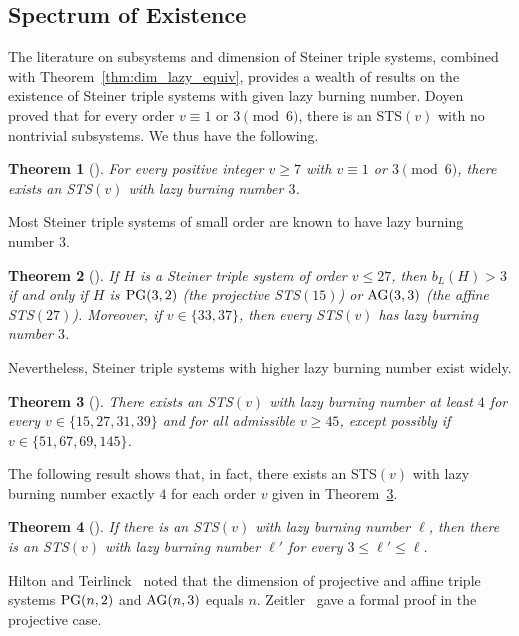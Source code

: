 \documentclass[12pt]{article}
\DeclareMathOperator{\PG}{\rm PG}
\DeclareMathOperator{\AG}{\rm AG}
\newtheorem{theorem}{Theorem}[section]
\theoremstyle{definition}
\numberwithin{table}{section}
\begin{document}
\subsection{Spectrum of Existence}
The literature on subsystems and dimension of Steiner triple systems, combined with Theorem~\ref{thm:dim_lazy_equiv}, provides a wealth of results on the existence of Steiner triple systems with given lazy burning number.  Doyen~\cite{STS_with_no_subsystems} proved that for every order $v \equiv 1$ or $3\pmod{6}$, there is an STS$(v)$ with no nontrivial subsystems.  We thus have the following.
\begin{theorem}[\cite{STS_with_no_subsystems}] \label{LazyBurning3}
For every positive integer $v \geq 7$ with $v \equiv 1$ or $3\pmod{6}$, there exists an STS$(v)$ with lazy burning number $3$.
\end{theorem}
Most Steiner triple systems of small order are known to have lazy burning number $3$.
\begin{theorem}[\cite{Doyen1970, TeirlinckThesis}]
If $H$ is a Steiner triple system of order $v \leq 27$, then $b_L(H)>3$ if and only if $H$ is $\PG(3,2)$ (the projective STS$(15)$) or $\AG(3,3)$ (the affine STS$(27)$).  Moreover, if $v \in \{33,37\}$, then every STS$(v)$ has lazy burning number $3$.
\end{theorem}
Nevertheless, Steiner triple systems with higher lazy burning number exist widely.

\begin{theorem}[\cite{TeirlinckThesis}]\label{LazyBurning4}
There exists an STS$(v)$ with lazy burning number at least $4$ for every $v \in \{15,27,31,39\}$ and for all admissible $v \geq 45$, except possibly if $v \in \{51,67,69,145\}$.
\end{theorem}

The following result shows that, in fact, there exists an STS$(v)$ with lazy burning number exactly $4$ for each order $v$ given in Theorem~\ref{LazyBurning4}.

\begin{theorem}[\cite{Teirlinck1979}]
If there is an STS$(v)$ with lazy burning number $\ell$, then there is an STS$(v)$ with lazy burning number $\ell'$ for every $3 \leq \ell' \leq \ell$.
\end{theorem}

Hilton and Teirlinck~\cite{HiltonTeirlinck1980} noted that the dimension of projective and affine triple systems $\PG(n,2)$ and $\AG(n,3)$ equals $n$.
Zeitler~\cite{Zeitler1987} gave a formal proof in the projective case. 
\end{document}

